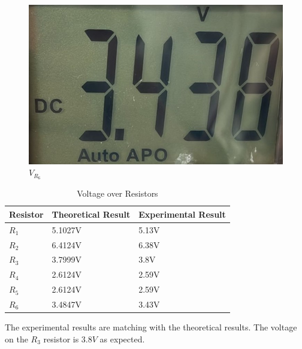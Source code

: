 \begin{figure}[h]
\begin{minipage}{.25\textwidth}
        \caption{$V_{R_5}$}
        \label{fig:exp_r5}
    \end{minipage}%
    \begin{minipage}{.25\textwidth}
        \includegraphics[width=0.9\linewidth]{assets/exp_r6.jpeg}
        \caption{$V_{R_6}$}
        \label{fig:exp_r6}
    \end{minipage}
\end{figure}

\begin{table}[h]
    \centering
    \begin{tabular}{|l|l|l|}
        \hline
        \textbf{Resistor} & \textbf{Theoretical Result} & \textbf{Experimental Result} \\ \hline
        $R_1$             & 5.1027V                     & 5.13V                        \\ \hline
        $R_2$             & 6.4124V                     & 6.38V                        \\ \hline
        $R_3$             & 3.7999V                     & 3.8V                         \\ \hline
        $R_4$             & 2.6124V                     & 2.59V                        \\ \hline
        $R_5$             & 2.6124V                     & 2.59V                        \\ \hline
        $R_6$             & 3.4847V                     & 3.43V                        \\ \hline
    \end{tabular}
    \caption{Voltage over Resistors}
\end{table}

The experimental results are matching with the theoretical results. The voltage on the $R_3$ resistor is $3.8V$ as expected.


